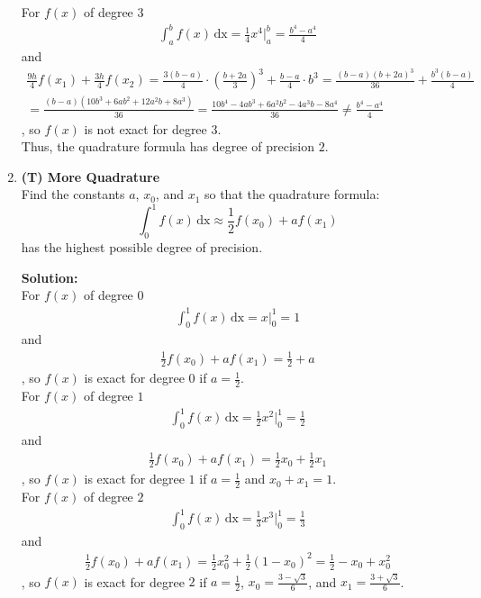 \documentclass[12pt]{article}
\begin{document}
\begin{enumerate}[label=\bfseries Problem \arabic*:]
For $f(x)$ of degree $3$
\begin{align*}
    \int_a^b f(x) \, \text{dx}=\frac{1}{4}x^4|_{a}^{b}=\frac{b^4-a^4}{4}
\end{align*}
and
\begin{multline*}
    \frac{9h}{4} f(x_1)+\frac{3h}{4} f(x_2)=\frac{3(b-a)}{4}\cdot (\frac{b+2a}{3})^3+\frac{b-a}{4}\cdot b^3=\frac{(b-a)(b+2a)^3}{36}+\frac{b^3(b-a)}{4}\\
    =\frac{(b-a)(10b^3+6ab^2+12a^2b+8a^3)}{36}=\frac{10b^4-4ab^3+6a^2b^2-4a^3b-8a^4}{36}\neq\frac{b^4-a^4}{4}
\end{multline*}
, so $f(x)$ is not exact for degree $3$.\\

Thus, the quadrature formula has degree of precision $2$.



\newpage 

 \item \textbf{(T) More Quadrature}\\
 Find the constants $a$, $x_0$, and $x_1$ so that the quadrature formula:
$$\int_0^1 f(x)\, \text{dx}\approx \frac{1}{2} f(x_0) + a f(x_1) $$
has the highest possible degree of precision.


\vspace{1em}
\textbf{Solution:}\\
For $f(x)$ of degree $0$
\begin{align*}
    \int_0^1 f(x) \, \text{dx}=x|_{0}^{1}=1
\end{align*}
and
\begin{align*}
    \frac{1}{2} f(x_0) + a f(x_1) =\frac{1}{2}+a
\end{align*}
, so $f(x)$ is exact for degree $0$ if $a=\frac{1}{2}$.\\

For $f(x)$ of degree $1$
\begin{align*}
    \int_0^1 f(x) \, \text{dx}=\frac{1}{2}x^2|_{0}^{1}=\frac{1}{2}
\end{align*}
and
\begin{align*}
    \frac{1}{2} f(x_0) + a f(x_1) = \frac{1}{2}x_0 + \frac{1}{2}x_1
\end{align*}
, so $f(x)$ is exact for degree $1$ if $a=\frac{1}{2}$ and $x_0+x_1=1$.\\

For $f(x)$ of degree $2$
\begin{align*}
    \int_0^1 f(x) \, \text{dx}=\frac{1}{3}x^3|_{0}^{1}=\frac{1}{3}
\end{align*}
and
\begin{align*}
    \frac{1}{2} f(x_0) + a f(x_1) = \frac{1}{2}x_0^2 + \frac{1}{2}(1-x_0)^2 = \frac{1}{2}-x_0+x_0^2
\end{align*}
, so $f(x)$ is exact for degree $2$ if $a=\frac{1}{2}$, $x_0=\frac{3-\sqrt{3}}{6}$, and $x_1=\frac{3+\sqrt{3}}{6}$.\\


\end{enumerate}
\end{document}
